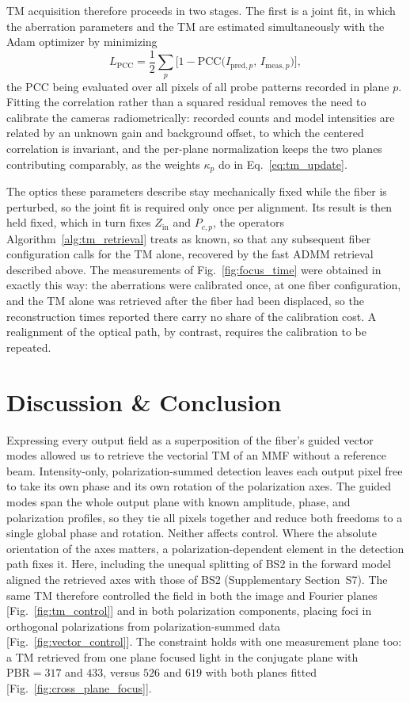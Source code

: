 \documentclass{article}
\begin{document}
TM acquisition therefore proceeds in two stages.
The first is a joint fit, in which the aberration parameters and the TM are estimated simultaneously with the Adam optimizer by minimizing
\begin{equation}
\label{eq:pcc_loss}
L_{\text{PCC}} = \frac{1}{2}\sum_{p} \Big[ 1 - \mathrm{PCC}\big(I_{\text{pred},p},\, I_{\text{meas},p}\big) \Big],
\end{equation}
the PCC being evaluated over all pixels of all probe patterns recorded in plane $p$.
Fitting the correlation rather than a squared residual removes the need to calibrate the cameras radiometrically: recorded counts and model intensities are related by an unknown gain and background offset, to which the centered correlation is invariant, and the per-plane normalization keeps the two planes contributing comparably, as the weights $\kappa_p$ do in Eq.~\eqref{eq:tm_update}.

The optics these parameters describe stay mechanically fixed while the fiber is perturbed, so the joint fit is required only once per alignment.
Its result is then held fixed, which in turn fixes $Z_{\text{in}}$ and $P_{c,p}$, the operators Algorithm~\ref{alg:tm_retrieval} treats as known, so that any subsequent fiber configuration calls for the TM alone, recovered by the fast ADMM retrieval described above.
The measurements of Fig.~\ref{fig:focus_time} were obtained in exactly this way: the aberrations were calibrated once, at one fiber configuration, and the TM alone was retrieved after the fiber had been displaced, so the reconstruction times reported there carry no share of the calibration cost.
A realignment of the optical path, by contrast, requires the calibration to be repeated.

\section{Discussion \& Conclusion}
Expressing every output field as a superposition of the fiber's guided vector modes allowed us to retrieve the vectorial TM of an MMF without a reference beam. Intensity-only, polarization-summed detection leaves each output pixel free to take its own phase and its own rotation of the polarization axes. The guided modes span the whole output plane with known amplitude, phase, and polarization profiles, so they tie all pixels together and reduce both freedoms to a single global phase and rotation. Neither affects control. Where the absolute orientation of the axes matters, a polarization-dependent element in the detection path fixes it. Here, including the unequal splitting of BS2 in the forward model aligned the retrieved axes with those of BS2 (Supplementary Section~S7). The same TM therefore controlled the field in both the image and Fourier planes [Fig.~\ref{fig:tm_control}] and in both polarization components, placing foci in orthogonal polarizations from polarization-summed data [Fig.~\ref{fig:vector_control}]. The constraint holds with one measurement plane too: a TM retrieved from one plane focused light in the conjugate plane with $\mathrm{PBR}=317$ and $433$, versus $526$ and $619$ with both planes fitted [Fig.~\ref{fig:cross_plane_focus}].
\end{document}
